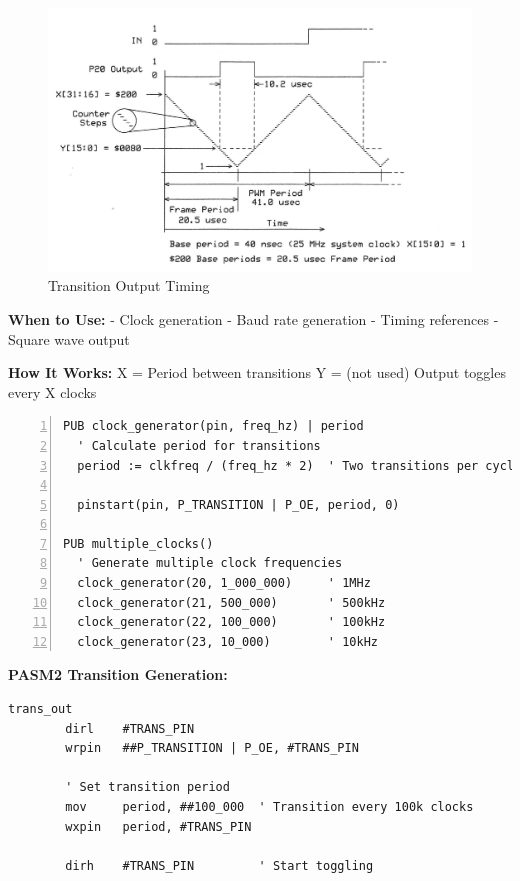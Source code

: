 \documentclass[11pt,a4paper,oneside,english]{book}
\begin{document}
\begin{figure}
\centering
\includegraphics{assets/P2 SmartPins-220809_page20_img01.png}
\caption{Transition Output Timing}
\end{figure}

\textbf{When to Use:} - Clock generation - Baud rate generation - Timing
references - Square wave output

\textbf{How It Works:} X = Period between transitions Y = (not used)
Output toggles every X clocks

\begin{Spin2Block}
\begin{Verbatim}[numbers=left,numbersep=5pt,xleftmargin=15pt]
PUB clock_generator(pin, freq_hz) | period
  ' Calculate period for transitions
  period := clkfreq / (freq_hz * 2)  ' Two transitions per cycle
  
  pinstart(pin, P_TRANSITION | P_OE, period, 0)

PUB multiple_clocks()
  ' Generate multiple clock frequencies
  clock_generator(20, 1_000_000)     ' 1MHz
  clock_generator(21, 500_000)       ' 500kHz
  clock_generator(22, 100_000)       ' 100kHz
  clock_generator(23, 10_000)        ' 10kHz
\end{Verbatim}
\end{Spin2Block}

\textbf{PASM2 Transition Generation:}

\begin{PASM2Block}
\begin{lstlisting}
trans_out
        dirl    #TRANS_PIN
        wrpin   ##P_TRANSITION | P_OE, #TRANS_PIN
        
        ' Set transition period
        mov     period, ##100_000  ' Transition every 100k clocks
        wxpin   period, #TRANS_PIN
        
        dirh    #TRANS_PIN         ' Start toggling
\end{lstlisting}
\end{PASM2Block}
\end{document}
